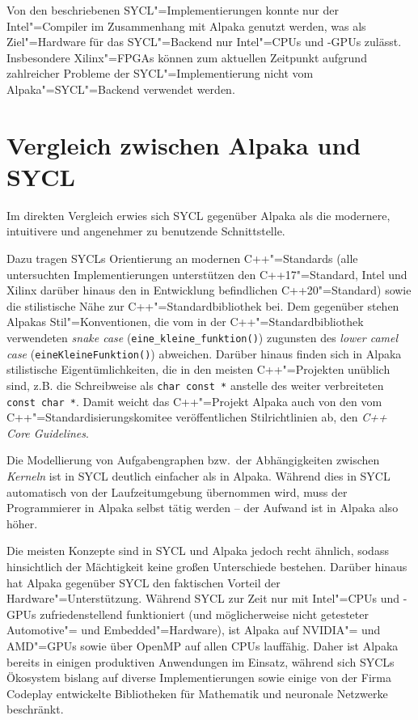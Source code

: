 Von den beschriebenen SYCL"=Implementierungen konnte nur der Intel"=Compiler im
Zusammenhang mit Alpaka genutzt werden, was als Ziel"=Hardware für das
SYCL"=Backend nur Intel"=CPUs und -GPUs zulässt. Insbesondere Xilinx"=FPGAs
können zum aktuellen Zeitpunkt aufgrund zahlreicher Probleme der
SYCL"=Implementierung nicht vom Alpaka"=SYCL"=Backend verwendet werden.

\section{Vergleich zwischen Alpaka und SYCL}

Im direkten Vergleich erwies sich SYCL gegenüber Alpaka als die modernere,
intuitivere und angenehmer zu benutzende Schnittstelle.

Dazu tragen SYCLs Orientierung an modernen C++"=Standards (alle untersuchten
Implementierungen unterstützen den C++17"=Standard, Intel und Xilinx darüber
hinaus den in Entwicklung befindlichen C++20"=Standard) sowie die stilistische
Nähe zur C++"=Standardbibliothek bei. Dem gegenüber stehen Alpakas
Stil"=Konventionen, die vom in der C++"=Standardbibliothek verwendeten
\textit{snake case} (\texttt{eine\_kleine\_funktion()}) zugunsten des
\textit{lower camel case} (\texttt{eineKleineFunktion()}) abweichen. Darüber
hinaus finden sich in Alpaka stilistische Eigentümlichkeiten, die in den meisten
C++"=Projekten unüblich sind, z.B. die Schreibweise als \texttt{char const *}
anstelle des weiter verbreiteten \texttt{const char *}. Damit weicht das
C++"=Projekt Alpaka auch von den vom C++"=Standardisierungskomitee
veröffentlichen Stilrichtlinien ab, den \textit{C++ Core Guidelines}.

Die Modellierung von Aufgabengraphen bzw.\ der Abhängigkeiten zwischen
\textit{Kerneln} ist in SYCL deutlich einfacher als in Alpaka. Während dies in
SYCL automatisch von der Laufzeitumgebung übernommen wird, muss der
Programmierer in Alpaka selbst tätig werden -- der Aufwand ist in Alpaka also
höher.

Die meisten Konzepte sind in SYCL und Alpaka jedoch recht ähnlich, sodass
hinsichtlich der Mächtigkeit keine großen Unterschiede bestehen. Darüber hinaus
hat Alpaka gegenüber SYCL den faktischen Vorteil der Hardware"=Unterstützung.
Während SYCL zur Zeit nur mit Intel"=CPUs und -GPUs zufriedenstellend
funktioniert (und möglicherweise nicht getesteter Automotive"= und
Embedded"=Hardware), ist Alpaka auf NVIDIA"= und AMD"=GPUs sowie über OpenMP auf
allen CPUs lauffähig. Daher ist Alpaka bereits in einigen produktiven
Anwendungen im Einsatz, während sich SYCLs Ökosystem bislang auf diverse
Implementierungen sowie einige von der Firma Codeplay entwickelte Bibliotheken
für Mathematik und neuronale Netzwerke beschränkt. 

